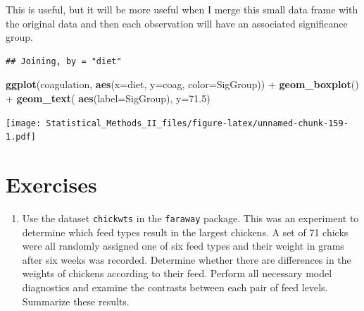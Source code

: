 \documentclass[]{book}
\newenvironment{Shaded}{\begin{snugshade}}{\end{snugshade}}
\newcommand{\KeywordTok}[1]{\textcolor[rgb]{0.13,0.29,0.53}{\textbf{{#1}}}}
\newcommand{\DataTypeTok}[1]{\textcolor[rgb]{0.13,0.29,0.53}{{#1}}}
\newcommand{\FloatTok}[1]{\textcolor[rgb]{0.00,0.00,0.81}{{#1}}}
\newcommand{\StringTok}[1]{\textcolor[rgb]{0.31,0.60,0.02}{{#1}}}
\newcommand{\NormalTok}[1]{{#1}}
\providecommand{\tightlist}{%
  \setlength{\itemsep}{0pt}\setlength{\parskip}{0pt}}
\theoremstyle{definition}
\theoremstyle{definition}
\theoremstyle{remark}
\begin{document}
This is useful, but it will be more useful when I merge this small data
frame with the original data and then each observation will have an
associated significance group.

\begin{Shaded}
\end{Shaded}

\begin{verbatim}
## Joining, by = "diet"
\end{verbatim}

\begin{Shaded}
\begin{Highlighting}[]
\KeywordTok{ggplot}\NormalTok{(coagulation, }\KeywordTok{aes}\NormalTok{(}\DataTypeTok{x=}\NormalTok{diet, }\DataTypeTok{y=}\NormalTok{coag, }\DataTypeTok{color=}\NormalTok{SigGroup)) +}
\StringTok{  }\KeywordTok{geom_boxplot}\NormalTok{() +}
\StringTok{  }\KeywordTok{geom_text}\NormalTok{( }\KeywordTok{aes}\NormalTok{(}\DataTypeTok{label=}\NormalTok{SigGroup), }\DataTypeTok{y=}\FloatTok{71.5}\NormalTok{)}
\end{Highlighting}
\end{Shaded}

\texttt{[image: Statistical\_Methods\_II\_files/figure-latex/unnamed-chunk-159-1.pdf]}

\section{Exercises}\label{exercises-7}

\begin{enumerate}
\def\labelenumi{\arabic{enumi}.}
\tightlist
\item
  Use the dataset \texttt{chickwts} in the \texttt{faraway} package.
  This was an experiment to determine which feed types result in the
  largest chickens. A set of 71 chicks were all randomly assigned one of
  six feed types and their weight in grams after six weeks was recorded.
  Determine whether there are differences in the weights of chickens
  according to their feed. Perform all necessary model diagnostics and
  examine the contrasts between each pair of feed levels. Summarize
  these results.
\end{enumerate}
\end{document}
